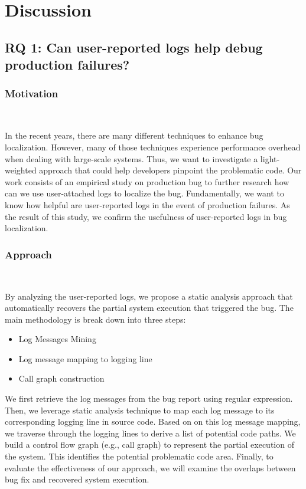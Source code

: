 \section{Discussion}

\subsection{RQ 1: Can user-reported logs help debug production failures?} \label{discussion_rq1}
	
	\subsubsection{Motivation}~ \label{rq1_motivation}

		In the recent years, there are many different techniques to enhance bug localization. However, many of those techniques experience performance overhead when dealing with large-scale systems. Thus, we want to investigate a light-weighted approach that could help developers pinpoint the problematic code. Our work consists of an empirical study on production bug to further research how can we use user-attached logs to localize the bug. Fundamentally, we want to know how helpful are user-reported logs in the event of production failures. As the result of this study, we confirm the usefulness of user-reported logs in bug localization.
	~\\
	
	\subsubsection{Approach}~ \label{rq1_approach}

		By analyzing the user-reported logs, we propose a static analysis approach that automatically recovers the partial system execution that triggered the bug. The main methodology is break down into three steps:
		\vspace{-0.1cm}
		\begin{itemize} \itemsep 0em
		 \item Log Messages Mining
		 \item Log message mapping to logging line
		 \item Call graph construction
		\end{itemize}

		 We first retrieve the log messages from the bug report using regular expression. Then, we leverage static analysis technique to map each log message to its corresponding logging line in source code. Based on on this log message mapping, we traverse through the logging lines to derive a list of potential code paths. We build a control flow graph (e.g., call graph) to represent the partial execution of the system. This identifies the potential problematic code area. Finally, to evaluate the effectiveness of our approach, we will examine the overlaps between bug fix and recovered system execution.
		
